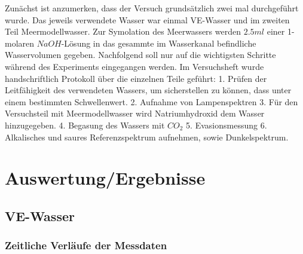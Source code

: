 \documentclass[12pt]{article}
\begin{document}
Zunächst ist anzumerken, dass der Versuch grundsätzlich zwei mal durchgeführt wurde. Das jeweils verwendete Wasser war einmal VE-Wasser und im zweiten Teil Meermodellwasser. Zur Symolation des Meerwassers werden $2.5ml$ einer 1-molaren $NaOH$-Lösung in das gesammte im Wasserkanal befindliche Wasservolumen gegeben.
Nachfolgend soll nur auf die wichtigsten Schritte während des Experiments eingegangen werden. Im Versuchsheft wurde handschriftlich Protokoll über die einzelnen Teile geführt:
1. Prüfen der Leitfähigkeit des verwendeten Wassers, um sicherstellen zu können, dass unter einem bestimmten Schwellenwert. 2. Aufnahme von Lampenspektren 3. Für den Versuchsteil mit Meermodellwasser wird Natriumhydroxid dem Wasser hinzugegeben. 4. Begasung des Wassers mit $CO_2$ 5. Evasionsmessung 6. Alkalisches und saures Referenzspektrum aufnehmen, sowie Dunkelspektrum.

\section{Auswertung/Ergebnisse}
\subsection{VE-Wasser}
\subsubsection{Zeitliche Verl\"aufe der Messdaten}
\end{document}

